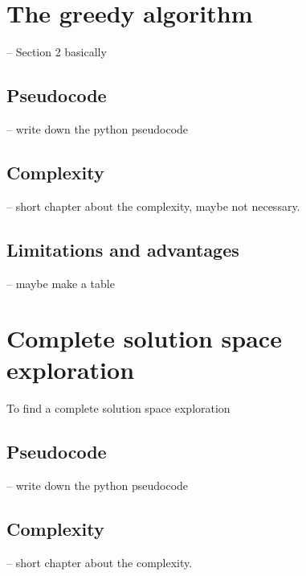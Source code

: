 \documentclass[a4paper,12pt,fleqn]{article}
\begin{document}

\newpage

\section{The greedy algorithm}
-- Section 2 basically

\subsection{Pseudocode}
-- write down the python pseudocode

\subsection{Complexity}
-- short chapter about the complexity, maybe not necessary.

\subsection{Limitations and advantages}
-- maybe make a table



\newpage

\section{Complete solution space exploration}
To find a complete solution space exploration

\subsection{Pseudocode}
-- write down the python pseudocode

\subsection{Complexity}
-- short chapter about the complexity.
\end{document}
